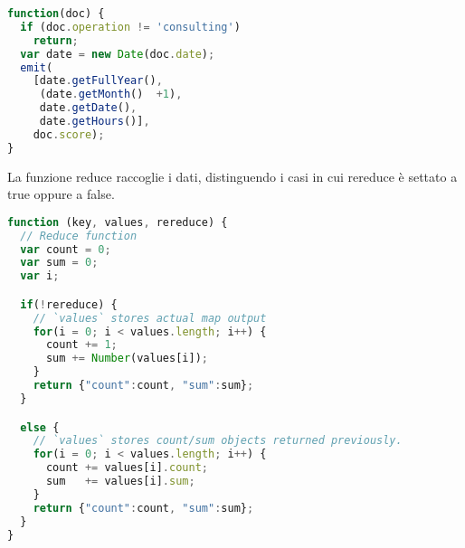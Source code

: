 \begin{lstlisting}[language=JavaScript] 
function(doc) {
  if (doc.operation != 'consulting') 
    return;
  var date = new Date(doc.date);
  emit(
    [date.getFullYear(), 
     (date.getMonth()  +1),
     date.getDate(),
     date.getHours()],
    doc.score); 
}
\end{lstlisting}
La funzione reduce raccoglie i dati, distinguendo i casi in cui rereduce è
settato a true oppure a false.
 \begin{lstlisting}[language=JavaScript]
function (key, values, rereduce) {
  // Reduce function
  var count = 0;
  var sum = 0;
  var i;

  if(!rereduce) {
    // `values` stores actual map output
    for(i = 0; i < values.length; i++) {
      count += 1;
      sum += Number(values[i]);
    }
    return {"count":count, "sum":sum};
  }

  else {
    // `values` stores count/sum objects returned previously.
    for(i = 0; i < values.length; i++) {
      count += values[i].count;
      sum   += values[i].sum;
    }
    return {"count":count, "sum":sum};
  }
}
\end{lstlisting}